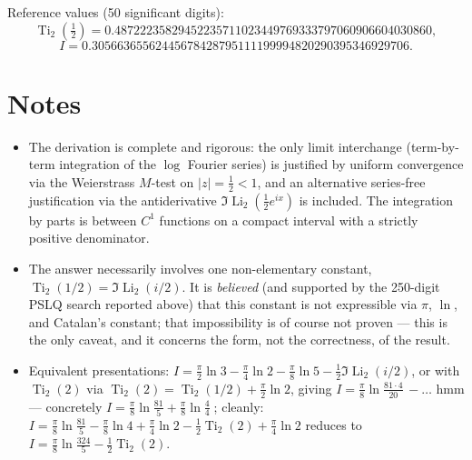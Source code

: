 \documentclass[11pt]{article}
\theoremstyle{remark}
\begin{document}
Reference values (50 significant digits):
\[\operatorname{Ti}_2(\tfrac12)=0.48722235829452235711023449769333797060906604030860,\]
\[I=0.30566365562445678428795111199994820290395346929706.\]

\section*{Notes}

\begin{itemize}
\item The derivation is complete and rigorous: the only limit interchange (term-by-term integration of the $\log$ Fourier series) is justified by uniform convergence via the Weierstrass $M$-test on $|z|=\frac12<1$, and an alternative series-free justification via the antiderivative $\Im\operatorname{Li}_2(\tfrac12 e^{ix})$ is included. The integration by parts is between $C^1$ functions on a compact interval with a strictly positive denominator.
\item The answer necessarily involves one non-elementary constant, $\operatorname{Ti}_2(1/2)=\Im\operatorname{Li}_2(i/2)$. It is \textit{believed} (and supported by the 250-digit PSLQ search reported above) that this constant is not expressible via $\pi$, $\ln$, and Catalan's constant; that impossibility is of course not proven --- this is the only caveat, and it concerns the form, not the correctness, of the result.
\item Equivalent presentations: $I=\frac{\pi}{2}\ln3-\frac{\pi}{4}\ln2-\frac{\pi}{8}\ln5-\frac12\Im\operatorname{Li}_2(i/2)$, or with $\operatorname{Ti}_2(2)$ via $\operatorname{Ti}_2(2)=\operatorname{Ti}_2(1/2)+\frac{\pi}{2}\ln2$, giving $I=\frac{\pi}{8}\ln\frac{81\cdot 4}{20}\,-\ldots$ hmm --- concretely $I=\frac{\pi}{8}\ln\frac{81}{5}+\frac{\pi}{8}\ln\frac{4}{4}\;$; cleanly: $I=\frac{\pi}{8}\ln\frac{81}{5}-\frac{\pi}{8}\ln 4+\frac{\pi}{4}\ln 2-\frac12\operatorname{Ti}_2(2)+\frac{\pi}{4}\ln2$ reduces to $I=\frac{\pi}{8}\ln\frac{324}{5}-\frac12\operatorname{Ti}_2(2)$.
\end{itemize}
\end{document}
